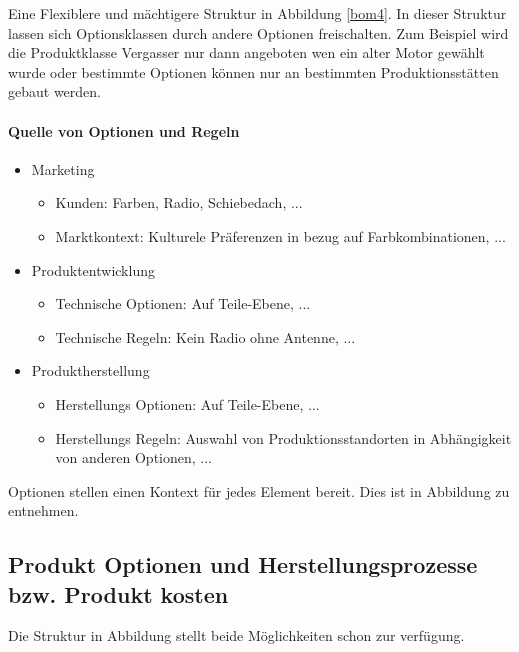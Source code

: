 
Eine Flexiblere und mächtigere Struktur in Abbildung \ref{bom4}. In dieser Struktur lassen sich Optionsklassen durch andere Optionen freischalten. Zum Beispiel wird die Produktklasse Vergasser nur dann angeboten wen ein alter Motor gewählt wurde oder bestimmte Optionen können nur an bestimmten Produktionsstätten gebaut werden.


\newpage
\paragraph{Quelle von Optionen und Regeln}
\begin{itemize}
\item {
Marketing
\begin{itemize}
\item Kunden: Farben, Radio, Schiebedach, ...
\item Marktkontext: Kulturele Präferenzen in bezug auf Farbkombinationen, ...
\end{itemize}
}
\item {
Produktentwicklung
\begin{itemize}
\item Technische Optionen: Auf Teile-Ebene, ...
\item Technische Regeln: Kein Radio ohne Antenne, ...
\end{itemize}
}
\item {
Produktherstellung
\begin{itemize}
\item Herstellungs Optionen: Auf Teile-Ebene, ...
\item Herstellungs Regeln: Auswahl von Produktionsstandorten in Abhängigkeit von anderen Optionen, ...
\end{itemize}
}
\end{itemize}

Optionen stellen einen Kontext für jedes Element bereit. Dies ist in Abbildung  zu entnehmen.


\subsection{Produkt Optionen und Herstellungsprozesse bzw. Produkt kosten}
Die Struktur in Abbildung  stellt beide Möglichkeiten schon zur verfügung.

